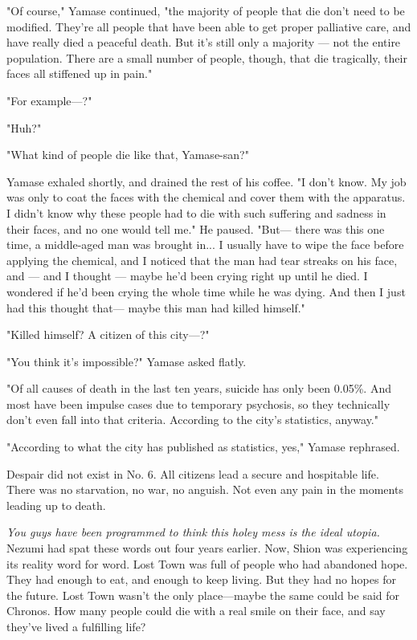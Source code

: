 "Of course," Yamase continued, "the majority of people that die don't
need to be modified. They're all people that have been able to get
proper palliative care, and have really died a peaceful death. But it's
still only a majority --- not the entire population. There are a small
number of people, though, that die tragically, their faces all stiffened
up in pain."

"For example---?"

"Huh?"

"What kind of people die like that, Yamase-san?"

Yamase exhaled shortly, and drained the rest of his coffee. "I don't
know. My job was only to coat the faces with the chemical and cover them
with the apparatus. I didn't know why these people had to die with such
suffering and sadness in their faces, and no one would tell me." He
paused. "But--- there was this one time, a middle-aged man was brought
in... I usually have to wipe the face before applying the chemical, and
I noticed that the man had tear streaks on his face, and --- and I thought
--- maybe he'd been crying right up until he died. I wondered if he'd been
crying the whole time while he was dying. And then I just had this
thought that--- maybe this man had killed himself."

"Killed himself? A citizen of this city---?"

"You think it's impossible?" Yamase asked flatly.

"Of all causes of death in the last ten years, suicide has only been
0.05\%. And most have been impulse cases due to temporary psychosis, so
they technically don't even fall into that criteria. According to the
city's statistics, anyway."

"According to what the city has published as statistics, yes," Yamase
rephrased.

Despair did not exist in No. 6. All citizens lead a secure and
hospitable life. There was no starvation, no war, no anguish. Not even
any pain in the moments leading up to death.

\emph{You guys have been programmed to think this holey mess is the ideal
utopia.} Nezumi had spat these words out four years earlier. Now, Shion
was experiencing its reality word for word. Lost Town was full of people
who had abandoned hope. They had enough to eat, and enough to keep
living. But they had no hopes for the future. Lost Town wasn't the only
place---maybe the same could be said for Chronos. How many people could
die with a real smile on their face, and say they've lived a fulfilling
life?

